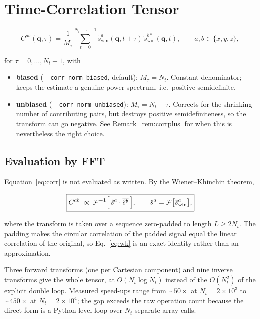 \documentclass[12pt, a4paper, oneside]{article}
\newcommand{\qvec}{\mathbf{q}}
\newcommand{\Nt}{N_t}
\begin{document}
\section{Time-Correlation Tensor}
\label{sec:corr}

\begin{equation}
\boxed{
    C^{ab}(\qvec,\tau) = \frac{1}{M_\tau}\sum_{t=0}^{\Nt-\tau-1}
    \tilde s^a_{\text{win}}(\qvec,t+\tau)\,
    \tilde s^{b*}_{\text{win}}(\qvec,t),
    \qquad a,b\in\{x,y,z\},
}
\label{eq:corr}
\end{equation}

for $\tau = 0,\dots,\Nt-1$, with

\begin{itemize}
    \item \textbf{biased} (\texttt{-\/-corr-norm biased}, default):
    $M_\tau = \Nt$. Constant denominator; keeps the estimate a genuine power
    spectrum, i.e.\ positive semidefinite.
    \item \textbf{unbiased} (\texttt{-\/-corr-norm unbiased}):
    $M_\tau = \Nt-\tau$. Corrects for the shrinking number of contributing
    pairs, but destroys positive semidefiniteness, so the transform can go
    negative. See Remark~\ref{rem:corrplus} for when this is nevertheless the
    right choice.
\end{itemize}

\subsection{Evaluation by FFT}
\label{sec:wk}

Equation~\eqref{eq:corr} is not evaluated as written. By the Wiener--Khinchin
theorem,

\begin{equation}
\boxed{
    C^{ab} \;\propto\; \mathcal{F}^{-1}\Bigl[\,
        \hat s^a \cdot \overline{\hat s^b}\,\Bigr],
    \qquad \hat s^a = \mathcal{F}\bigl[\tilde s^a_{\text{win}}\bigr],
}
\label{eq:wk}
\end{equation}

where the transform is taken over a sequence zero-padded to length
$L \ge 2\Nt$. The padding makes the circular correlation of the padded signal
equal the linear correlation of the original, so Eq.~\eqref{eq:wk} is an exact
identity rather than an approximation.

Three forward transforms (one per Cartesian component) and nine inverse
transforms give the whole tensor, at $O(\Nt\log\Nt)$ instead of the $O(\Nt^2)$
of the explicit double loop. Measured speed-ups range from $\sim50\times$ at
$\Nt = 2\times10^3$ to $\sim450\times$ at $\Nt = 2\times10^4$; the gap exceeds
the raw operation count because the direct form is a Python-level loop over
$\Nt$ separate array calls.
\end{document}
